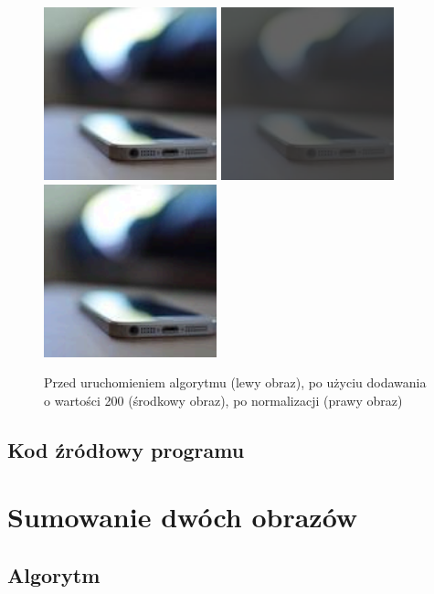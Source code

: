 \documentclass[a4paper,12pt]{book}
\begin{document}
\begin{figure}[H]
	\caption{Przed uruchomieniem algorytmu (lewy obraz), po użyciu dodawania o wartości 200 (środkowy obraz), po normalizacji (prawy obraz)}
	\includegraphics[width=5cm, height=5cm]{phone-unmodified.jpg}
	\includegraphics[width=5cm, height=5cm]{3-1/sum-color-const-phone-200.png}
	\includegraphics[width=5cm, height=5cm]{3-1/sum-color-const-phone-200-norm.png}
\end{figure}

\subsection*{Kod źródłowy programu}

\section{Sumowanie dwóch obrazów}
\subsection*{Algorytm}
\end{document}
